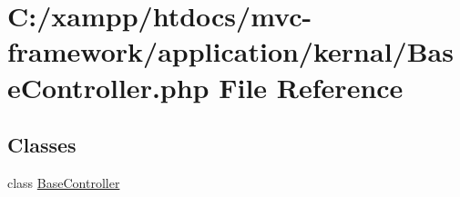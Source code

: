 \hypertarget{_base_controller_8php}{}\section{C\+:/xampp/htdocs/mvc-\/framework/application/kernal/\+Base\+Controller.php File Reference}
\label{_base_controller_8php}
\subsection*{Classes}
\begin{DoxyCompactItemize}
\item 
class \hyperlink{class_base_controller}{Base\+Controller}
\end{DoxyCompactItemize}
